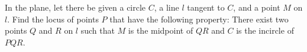 In the plane, let there be given a circle $C$, a line $l$ tangent to $C$, and a point $M$ on $l$. Find the locus of points $P$ that have the following property: There exist two points $Q$ and $R$ on $l$ such that $M$ is the midpoint of $QR$ and $C$ is the incircle of $PQR$.
